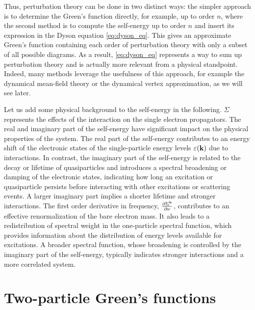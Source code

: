 \documentclass[\main/main.tex]{subfiles}
\begin{document}
Thus, perturbation theory can be done in two distinct ways: the simpler approach is to determine the Green's function directly, for example, up to order $n$, where the second method is to compute the self-energy up to order $n$ and insert its expression in the Dyson equation \eqref{eq:dyson_eq}. This gives an approximate Green's function containing each order of perturbation theory with only a subset of all possible diagrams. As a result, \eqref{eq:dyson_eq} represents a way to sum up perturbation theory and is actually more relevant from a physical standpoint. Indeed, many methods leverage the usefulness of this approach, for example the dynamical mean-field theory or the dynamical vertex approximation, as we will see later.

Let us add some physical background to the self-energy in the following. $\Sigma$ represents the effects of the interaction on the single electron propagators. The real and imaginary part of the self-energy have significant impact on the physical properties of the system. The real part of the self-energy contributes to an energy shift of the electronic states of the single-particle energy levels $\varepsilon(\textbf{k})$ due to interactions. In contrast, the imaginary part of the self-energy is related to the decay or lifetime of quasiparticles and introduces a spectral broadening or damping of the electronic states, indicating how long an excitation or quasiparticle persists before interacting with other excitations or scattering events. A larger imaginary part implies a shorter lifetime and stronger interactions. The first order derivative in frequency, $\frac{\partial \Sigma^{\text{k}}}{\partial \nu}$, contributes to an effective renormalization of the bare electron mass. It also leads to a redistribution of spectral weight in the one-particle spectral function, which provides information about the distribution of energy levels available for excitations. A broader spectral function, whose broadening is controlled by the imaginary part of the self-energy, typically indicates stronger interactions and a more correlated system.

\section{Two-particle Green's functions}
\end{document}
